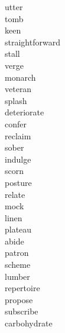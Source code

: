 \documentclass[b5paper, 11pt]{ctexart}
\begin{document}
\begin{multicols*}{3}
\begin{description}
\item[utter]

\item[tomb]

\item[keen]

\item[straightforward]

\item[stall]

\item[verge]

\item[monarch]

\item[veteran]

\item[splash]

\item[deteriorate]

\item[confer]

\item[reclaim]

\item[sober]

\item[indulge]

\item[scorn]

\item[posture]

\item[relate]

\item[mock]

\item[linen]

\item[plateau]

\item[abide]

\item[patron]

\item[scheme]

\item[lumber]

\item[repertoire]

\item[propose]

\item[subscribe]

\item[carbohydrate]


\end{description}
\end{multicols*}
\end{document}
